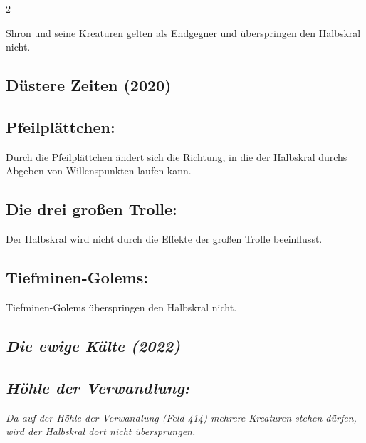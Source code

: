 \documentclass[10pt, a4paper, oneside]{book}
\newcommand{\fan}[1]{\textit{#1}}
\begin{document}
\begin{multicols*}{2}
\begin{bgcolor}[color-AG]
Shron und seine Kreaturen gelten als Endgegner und überspringen den Halbskral nicht.
\supercite{AG:Begleitheft}

\end{bgcolor}




\begin{bgcolor}[color-DZ]
\section{Düstere Zeiten (2020)}

\subsection{Pfeilplättchen:}

Durch die Pfeilplättchen ändert sich die Richtung, in die der Halbskral durchs Abgeben von Willenspunkten laufen kann.
\supercite{DZ:Begleitheft}


\subsection{Die drei großen Trolle:}

Der Halbskral wird nicht durch die Effekte der großen Trolle beeinflusst.
\supercite{DZ:Begleitheft}

\subsection{Tiefminen-Golems:}

Tiefminen-Golems überspringen den Halbskral nicht.
\supercite{DZ:Begleitheft}

\end{bgcolor}



\begin{bgcolor}
\section{\fan{Die ewige Kälte (2022)}}

\subsection{\fan{Höhle der Verwandlung:}}

\fan{Da auf der Höhle der Verwandlung (Feld 414) mehrere Kreaturen stehen dürfen, wird der Halbskral dort nicht übersprungen.} 

\end{bgcolor}





\end{multicols*}
\end{document}
